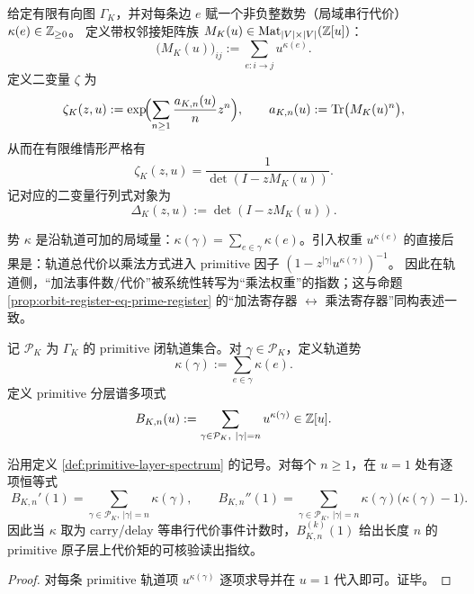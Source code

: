 \begin{definition}\label{def:zetaK-two-variable}
给定有限有向图 $\Gamma_K$，并对每条边 $e$ 赋一个非负整数势（局域串行代价）
$
\kappa(e)\in\mathbb{Z}_{\ge 0}
$。
定义带权邻接矩阵族 $M_K(u)\in\mathrm{Mat}_{|V|\times|V|}(\mathbb{Z}[u])$：
$$
\bigl(M_K(u)\bigr)_{ij}:=\sum_{e:i\to j}u^{\kappa(e)}.
$$
定义二变量 $\zeta$ 为
$$
\zeta_K(z,u):=\exp\!\Bigl(\sum_{n\ge 1}\frac{a_{K,n}(u)}{n}z^n\Bigr),
\qquad
a_{K,n}(u):=\mathrm{Tr}\bigl(M_K(u)^n\bigr),
$$
从而在有限维情形严格有
$$
\zeta_K(z,u)=\frac{1}{\det(I-zM_K(u))}.
$$
记对应的二变量行列式对象为
$$
\Delta_K(z,u):=\det(I-zM_K(u)).
$$
\end{definition}

\begin{remark}\label{rem:u-as-multiplicative-weight}
势 $\kappa$ 是沿轨道可加的局域量：$\kappa(\gamma)=\sum_{e\in\gamma}\kappa(e)$。引入权重 $u^{\kappa(e)}$ 的直接后果是：轨道总代价以乘法方式进入 primitive 因子
$
(1-z^{|\gamma|}u^{\kappa(\gamma)})^{-1}
$。
因此在轨道侧，“加法事件数/代价”被系统性转写为“乘法权重”的指数；这与命题 \ref{prop:orbit-register-eq-prime-register} 的“加法寄存器 $\leftrightarrow$ 乘法寄存器”同构表述一致。
\end{remark}

\begin{definition}\label{def:primitive-layer-spectrum}
记 $\mathcal{P}_K$ 为 $\Gamma_K$ 的 primitive 闭轨道集合。对 $\gamma\in\mathcal{P}_K$，定义轨道势
$$
\kappa(\gamma):=\sum_{e\in\gamma}\kappa(e).
$$
定义 primitive 分层谱多项式
$$
B_{K,n}(u):=\sum_{\gamma\in\mathcal{P}_K,\ |\gamma|=n}u^{\kappa(\gamma)}\in\ZZ[u].
$$
\end{definition}

\begin{corollary}\label{cor:primitive-cost-moments}
沿用定义 \ref{def:primitive-layer-spectrum} 的记号。对每个 \(n\ge 1\)，在 \(u=1\) 处有逐项恒等式
$$
\boxed{\;
B_{K,n}'(1)=\sum_{\gamma\in\mathcal{P}_K,\ |\gamma|=n}\kappa(\gamma),\qquad
B_{K,n}''(1)=\sum_{\gamma\in\mathcal{P}_K,\ |\gamma|=n}\kappa(\gamma)\bigl(\kappa(\gamma)-1\bigr).\;}
$$
因此当 \(\kappa\) 取为 carry/delay 等串行代价事件计数时，\(B_{K,n}^{(k)}(1)\) 给出长度 \(n\) 的 primitive 原子层上代价矩的可核验读出指纹。
\end{corollary}
\begin{proof}
对每条 primitive 轨道项 \(u^{\kappa(\gamma)}\) 逐项求导并在 \(u=1\) 代入即可。证毕。
\end{proof}

